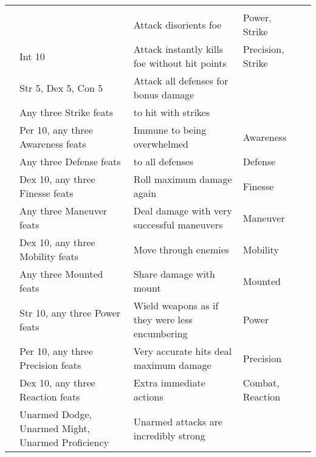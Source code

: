 \begin{longtabuwrapper}
\begin{longtabu}{>{\lcol}p{10em} >{\lcol}p{15em} >{\lcol}X >{\lcol}p{8em} >{\lcol}p{3em}}
        \midrule
         &  &  &  &  \\
         & \x & Attack disorients foe & Power, Strike &  \\
         & Int 10 & Attack instantly kills foe without hit points & Precision, Strike &  \\
         & Str 5, Dex 5, Con 5 & Attack all defenses for bonus damage & \x &  \\
         & Any three Strike feats &  to hit with strikes & \x &  \\
         & Per 10, any three Awareness feats & Immune to being overwhelmed & Awareness &  \\
         & Any three Defense feats &  to all defenses & Defense &  \\
         & Dex 10, any three Finesse feats & Roll maximum damage again & Finesse &  \\
         & Any three Maneuver feats & Deal damage with very successful maneuvers & Maneuver &  \\
         & Dex 10, any three Mobility feats & Move through enemies & Mobility&  \\
         & Any three Mounted feats & Share damage with mount & Mounted&  \\
         & Str 10, any three Power feats & Wield weapons as if they were less encumbering & Power&  \\
         & Per 10, any three Precision feats & Very accurate hits deal maximum damage & Precision &  \\
         & Dex 10, any three Reaction feats & Extra immediate actions & Combat, Reaction &  \\
         & Unarmed Dodge, Unarmed Might, Unarmed Proficiency & Unarmed attacks are incredibly strong & \x &  \\

\end{longtabu}
\end{longtabuwrapper}
